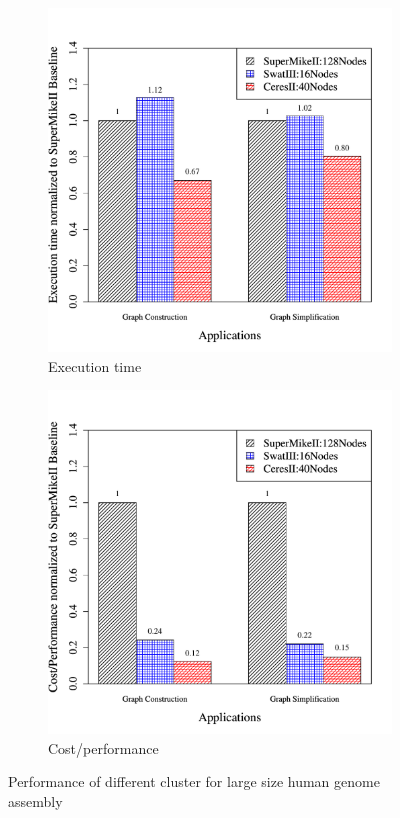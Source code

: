 \documentclass[journal]{IEEEtran}
\begin{document}
\begin{figure}[htb]
	\begin{subfigure}[b]{0.23\textwidth}
                \includegraphics[width=\textwidth]{Figures/PerformanceFigures/execTimeHum.pdf}
                \caption{Execution time}
                \label{fig:HumPerf}
    \end{subfigure}
 	\begin{subfigure}[b]{0.23\textwidth}
                \includegraphics[width=\textwidth]{Figures/PerformanceFigures/costTimeHum.pdf}
                \caption{Cost/performance }
                \label{fig:HumCost}
   \end{subfigure}
   \caption{Performance of different cluster for large size human genome assembly}
  \label{fig:Hum}
\end{figure}
\end{document}
